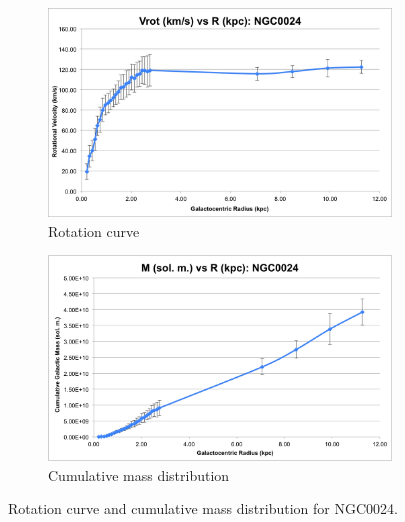 \documentclass{article}
\begin{document}
\begin{figure}
    \centering
    \begin{subfigure}{0.4\textwidth}
        \includegraphics[width=\textwidth]{vrot/Vrot-1}
        \caption{Rotation curve}
    \end{subfigure}
    \hfill
    \begin{subfigure}{0.4\textwidth}
        \includegraphics[width=\textwidth]{m/M-1}
        \caption{Cumulative mass distribution}
    \end{subfigure}
    \caption{Rotation curve and cumulative mass distribution for NGC0024.}
    \label{fig:ngc0024}
\end{figure}
\end{document}
